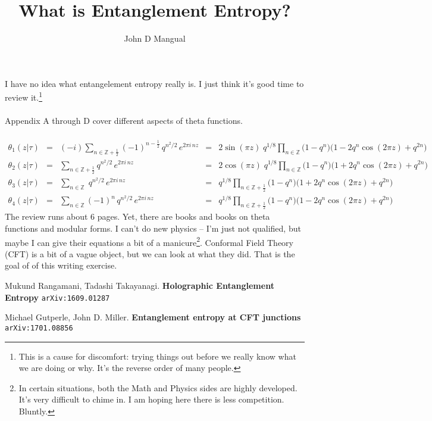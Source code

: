\documentclass[12pt]{article}
\title{What is Entanglement Entropy?}
\author{John D Mangual}
\date{}
\begin{document}
\selectfont \fontsize{12.5}{15}\selectfont

\maketitle

\noindent I have no idea what entangelement entropy really is.  I just think it's good time to review it.\footnote{This is a cause for discomfort: trying things out before we really know what we are doing or why.  It's the reverse order of many people.}  \\ \\
Appendix A through D cover different aspects of theta functions.  \\ \\ 
$$ \begin{array}{ccrcr}
\theta_1(z|\tau) & = & {\displaystyle (-i)\sum_{n \in \mathbb{Z} + \frac{1}{2}} }(-1)^{n - \frac{1}{2}} \, q^{n^2/2} \, e^{2\pi i \, n z} & = & 
{ \displaystyle 2 \sin (\pi z) \; q^{1/8} \prod_{n \in \mathbb{Z} } \big(1-q^n\big) \big( 1 - 2q^n \cos (2\pi z) + q^{2n} \big) } \\ 
\theta_2(z|\tau) & = & {\displaystyle \sum_{n \in \mathbb{Z} + \frac{1}{2}} } q^{n^2/2} \, e^{2\pi i \, n z} & = & 
{ \displaystyle 2 \cos (\pi z) \; q^{1/8} \prod_{n \in \mathbb{Z} } \big(1-q^n\big) \big( 1 + 2q^n \cos (2\pi z) + q^{2n} \big) } \\ 
\theta_3(z|\tau) & = & {\displaystyle \sum_{n \in \mathbb{Z} } \;q^{n^2/2} \, e^{2\pi i \, n z} } & = & 
{ \displaystyle  q^{1/8} \prod_{n \in \mathbb{Z} + \frac{1}{2}}  \big(1-q^n\big) \big( 1 + 2q^n \cos (2\pi z) + q^{2n} \big) } \\ 
\theta_4(z|\tau) & = & {\displaystyle \sum_{n \in \mathbb{Z} }(-1)^{n } \, q^{n^2/2} \, e^{2\pi i \, n z} } & = & 
{ \displaystyle  q^{1/8} \prod_{n \in \mathbb{Z} + \frac{1}{2}}  \big(1-q^n\big) \big( 1 - 2q^n \cos (2\pi z) + q^{2n} \big) } 
\end{array}$$
The review runs about 6 pages.  Yet, there are books and books on theta functions and modular forms.  I can't do new physics -- I'm just not qualified, but maybe I can give their equations a bit of a manicure\footnote{In certain situations, both the Math and Physics sides are highly developed.  It's very difficult to chime in.  I am hoping here there is less competition.  Bluntly.}.  Conformal Field Theory (CFT) is a bit of a vague object, but we can look at what they did.  That is the goal of of this writing exercise. 

\vfill

\begin{thebibliography}{}

\item Mukund Rangamani, Tadashi Takayanagi. \textbf{Holographic Entanglement Entropy} \texttt{arXiv:1609.01287}

\item Michael Gutperle, John D. Miller. \textbf{Entanglement entropy at CFT junctions} \texttt{arXiv:1701.08856}





\end{thebibliography}
\end{document}
